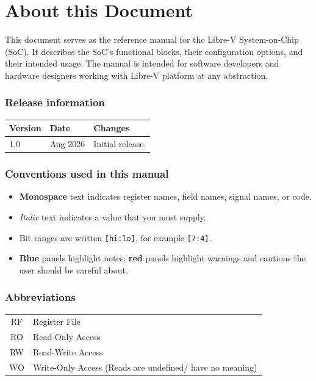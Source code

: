 \chapter*{About this Document}

This document serves as the reference manual for the Libre-V System-on-Chip (SoC). It describes the SoC's functional blocks, their configuration options, and their intended usage. The manual is intended for software developers and hardware designers working with Libre-V platform at any abstraction.

\subsection*{Release information}
\begin{tabularx}{\textwidth}{@{}l l X@{}}
\toprule
\textbf{Version} & \textbf{Date} & \textbf{Changes} \\
\midrule
1.0 & Aug 2026 & Initial release. \\
\bottomrule
\end{tabularx}

\subsection*{Conventions used in this manual}
\begin{itemize}[leftmargin=*]
  \item \textbf{Monospace} text indicates register names, field names, signal names, or code.
  \item \textit{Italic} text indicates a value that you must supply.
  \item Bit ranges are written \texttt{[hi:lo]}, for example \texttt{[7:4]}.
  \item \colorbox{docLightBlue}{\textcolor{docBlue}{\textbf{Blue}}} panels highlight notes; \colorbox{red!5}{\textcolor{docWarnRed}{\textbf{red}}} panels highlight warnings and cautions the user should be careful about.
\end{itemize}

\subsection*{Abbreviations}
\begin{tabular}{c l}
  RF & Register File \\
  RO & Read-Only Access \\
  RW & Read-Write Access \\
  WO & Write-Only Access (Reads are undefined/ have no meaning)\\
\end{tabular}

